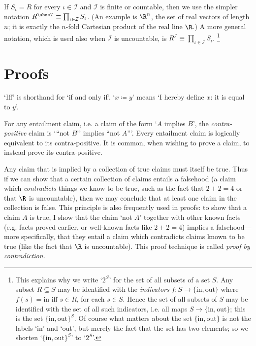 \documentclass[11pt,letterpaper,reqno,oneside]{book}
\begin{document}
\begin{appendices}
If $S_\iota = R$ for every $\iota \in \mathcal{I}$ and $\mathcal{I}$ is finite or countable, then we use the simpler notation $R^{\abs*{\mathcal{I}}} \equiv \prod_{\iota \in \mathcal{I}} S_\iota$.
(An example is $\R^n$, the set of real vectors of length $n$; it is exactly the $n$-fold Cartesian product of the real line $\R$.)
A more general notation, which is used also when $\mathcal{I}$ is uncountable, is $R^\mathcal{I} \equiv \prod_{\iota \in \mathcal{I}} S_\iota$.%
	\footnote{This explains why we write `$2^S$' for the set of all subsets of a set $S$. Any subset $R \subseteq S$ may be identified with the \emph{indicators} $f : S \to \{\text{in},\text{out}\}$ where $f(s)=\text{in}$ iff $s \in R$, for each $s \in S$. Hence the set of all subsets of $S$ may be identified with the set of all such indicators, i.e. all maps $S \to \{\text{in},\text{out}\}$; this is the set $\{\text{in},\text{out}\}^S$. Of course what matters about the set $\{\text{in},\text{out}\}$ is not the labels `in' and `out', but merely the fact that the set has two elements; so we shorten `$\{\text{in},\text{out}\}^S$' to `$2^S$'.}



\section{Proofs}
\label{math:pf}

`Iff' is shorthand for `if and only if'. `$x \coloneqq y$' means `I hereby define $x$: it is equal to $y$'.

For any entailment claim, i.e. a claim of the form `$A$ implies $B$', the \emph{contra-positive} claim is `{``}not $B$'' implies ``not $A${''}'. Every entailment claim is logically equivalent to its contra-positive. It is common, when wishing to prove a claim, to instead prove its contra-positive.

Any claim that is implied by a collection of true claims must itself be true. Thus if we can show that a certain collection of claims entails a falsehood (a claim which \emph{contradicts} things we know to be true, such as the fact that $2+2=4$ or that $\R$ is uncountable), then we may conclude that at least one claim in the collection is false. This principle is also frequently used in proofs: to show that a claim $A$ is true, I show that the claim `not $A$' together with other known facts (e.g. facts proved earlier, or well-known facts like $2+2=4$) implies a falsehood---more specifically, that they entail a claim which contradicts claims known to be true (like the fact that $\R$ is uncountable). This proof technique is called \emph{proof by contradiction.}


\end{appendices}
\end{document}
